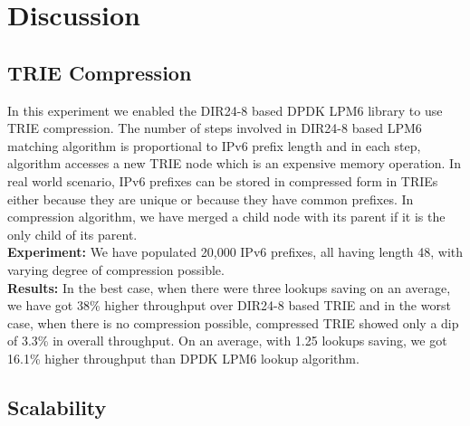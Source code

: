 

\section{Discussion}
\subsection{TRIE Compression}
In this experiment we enabled the DIR24-8\cite{Gupta98routinglookups} based DPDK LPM6 library to use TRIE compression. The number of steps involved in DIR24-8 based LPM6 matching algorithm is proportional to IPv6 prefix length and in each step, algorithm accesses a new TRIE node which is an expensive memory operation. In real world scenario, IPv6 prefixes can be stored in compressed form in TRIEs either because they are unique or because they have common prefixes. In compression algorithm, we have merged a child node with its parent if it is the only child of its parent.
\\
\textbf{Experiment:} We have populated 20,000 IPv6 prefixes, all having length 48, with varying degree of compression possible.
\\
\textbf{Results:} In the best case, when there were three lookups saving on an average, we have got 38\% higher throughput over DIR24-8 based TRIE and in the worst case, when there is no compression possible, compressed TRIE showed only a dip of 3.3\% in overall throughput. On an average, with 1.25 lookups saving, we got 16.1\% higher throughput than DPDK LPM6 lookup algorithm.



\subsection{Scalability}
